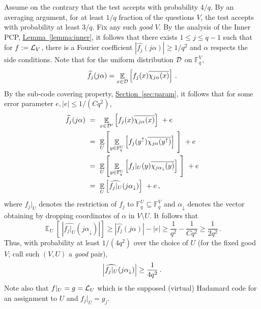 \documentclass[10pt]{article}
\theoremstyle{definition}
\numberwithin{equation}{section}
\newcommand{\expref}[2]{\texorpdfstring{\hyperref[#2]{#1~\ref{#2}}}{#1~\ref{#2}}}
\newcommand\calL{{\cal L}}
\newcommand\F{\mathbb{F}}
\DeclareMathOperator*\Exp{\mathbb{E}}
\begin{document}
Assume on the contrary that the test accepts with probability ${4}/{q}$. By an averaging argument,
for at least ${1}/{q}$ fraction of the questions $V$, the test accepts
with probability at least ${3}/{q}$. Fix any such \emph{good} $V$.
By the analysis of the Inner PCP, \expref{Lemma}{lemma:inner},
it follows that there exists $1 \leq j\leq q-1$ such that for
$f := \calL_V$, there is a Fourier coefficient $|\widehat{f_j}(j\alpha)| \geq {1}/{q^2}$ and
$\alpha$ respects the side conditions.
Note that for the uniform distribution ${\cal D}$ on $\F_q^V$,
 $$ \widehat{f_j}(j\alpha) = \Exp_{x \in {\cal D}} \left[ f_j(x)  \overline{\chi_{j\alpha}(x)}   \right]\,. $$
By the sub-code covering property, \expref{Section}{sec:param}, it follows that for some error parameter
$e, |e| \leq {1}/{(C q^2)}$,
\begin{align*}
\widehat{f_j}(j\alpha)\ &= \ \Exp_{x \in {\cal D'}} \left[  f_j(x) \overline{\chi_{j\alpha}(x)}   \right] \  + e \\
 & = \  \Exp_U \left[   \Exp_{y \in \F_q^U} \left[ f_j(y^\uparrow)
 \overline{\chi_{j\alpha}(y^\uparrow)}  \right]  \ \right] \ + e \\
 & = \  \Exp_U \left[   \Exp_{y \in \F_q^U} \left[ f_j|_U(y)
 \overline{\chi_{j\alpha_\downarrow}(y)}  \right]  \ \right] \ + e \\
 & = \  \Exp_U \left[ \widehat{f_j|_U} (j \alpha_\downarrow) \right] \ + e\,,
\end{align*}
where
$f_j|_U$ denotes the restriction of $f_j$ to $\F_q^U \subseteq \F_q^V$
and $\alpha_\downarrow$
denotes the vector obtaining by dropping coordinates of $\alpha$ in $V \setminus U$.
It follows that
 $$  \Exp_U \left[ \ \left| \widehat{f_j|_U} (j \alpha_\downarrow) \right| \right]
\geq |\widehat{f_j}(j\alpha)| - |e| \geq \frac{1}{q^2}- \frac{1}{Cq^2} \geq \frac{1}{2q^2}\,. $$
Thus, with probability at least
${1}/{(4q^2)}$ over the choice of $U$ (for the fixed good $V$; call such $(V,U)$  a \emph{good} pair),
\[
\Bigl|\widehat{f_j|_U}({j \alpha_\downarrow})\Bigr| \geq \frac{1}{4q^2}\,.
\]
Note also that
$f|_U = g = \calL_U$ which is the supposed (virtual) Hadamard code for an assignment to $U$ and
$f_j|_U = g_j$.
\end{document}
